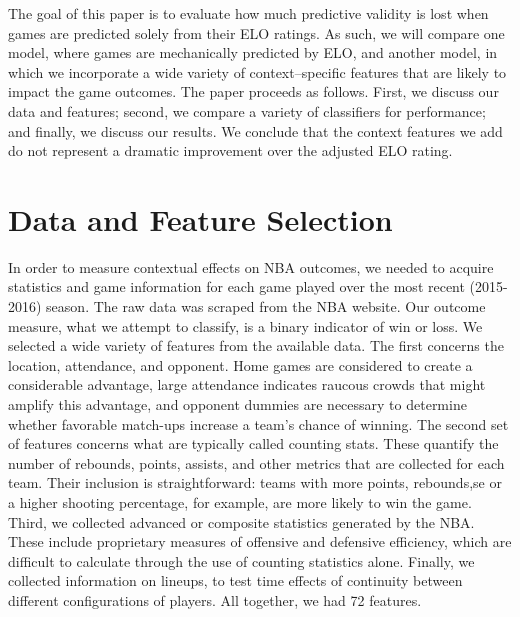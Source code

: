 \documentclass[12pt]{article}
\begin{document}
The goal of this paper is to evaluate how much predictive validity is lost when games are predicted solely from their ELO ratings. As such, we will compare one model, where games are mechanically predicted by ELO, and another model, in which we incorporate a wide variety of context--specific features that are likely to impact the game outcomes. The paper proceeds as follows. First, we discuss our data and features; second, we compare a variety of classifiers for performance; and finally, we discuss our results. We conclude that the context features we add do not represent a dramatic improvement over the adjusted ELO rating.

\section{Data and Feature Selection}

In order to measure contextual effects on NBA outcomes, we needed to acquire statistics and game information for each game played over the most recent (2015-2016) season. The raw data was scraped from the NBA website. Our outcome measure, what we attempt to classify, is a binary indicator of win or loss. We selected a wide variety of features from the available data. The first concerns the location, attendance, and opponent. Home games are considered to create a considerable advantage, large attendance indicates raucous crowds that might amplify this advantage, and opponent dummies are necessary to determine whether favorable match-ups increase a team's chance of winning. The second set of features concerns what are typically called counting stats. These quantify the number of rebounds, points, assists, and other metrics that are collected for each team. Their inclusion is straightforward: teams with more points, rebounds,se or a higher shooting percentage, for example, are more likely to win the game. Third, we collected advanced or composite statistics generated by the NBA. These include proprietary measures of offensive and defensive efficiency, which are difficult to calculate through the use of counting statistics alone. Finally, we collected information on lineups, to test time effects of continuity between different configurations of players. All together, we had 72 features.
\end{document}
